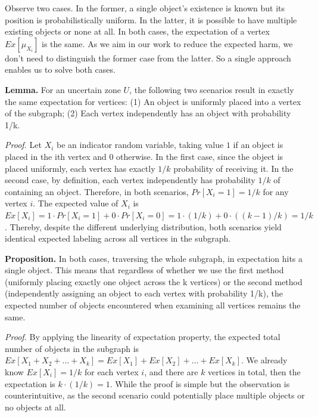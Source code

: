 \vspace{5mm}

Observe two cases. In the former, a single object's existence is known but its position is probabilistically uniform. In the latter, it is possible to have multiple existing objects or none at all. In both cases, the expectation of a vertex $Ex[\mu_{X_i}]$ is the same. As we aim in our work to reduce the expected harm, we don't need to distinguish the former case from the latter. So a single approach enables us to solve both cases.

\textbf{Lemma.} For an uncertain zone $U$, the following two scenarios result in exactly the same expectation for vertices: (1) An object is uniformly placed into a vertex of the subgraph; (2) Each vertex independently has an object with probability 1/k.

\textit{Proof.} Let $X_i$ be an indicator random variable, taking value $1$ if an object is placed in the ith vertex and $0$ otherwise. In the first case, since the object is placed uniformly, each vertex has exactly $1/k$ probability of receiving it. In the second case, by definition, each vertex independently has probability $1/k$ of containing an object. Therefore, in both scenarios, $Pr[X_i=1] = 1/k$ for any vertex $i$. The expected value of $X_i$ is $Ex[X_i] = 1 · Pr[X_i=1] + 0 · Pr[X_i=0] = 1 · (1/k) + 0 · ((k-1)/k) = 1/k$. Thereby, despite the different underlying distribution, both scenarios yield identical expected labeling across all vertices in the subgraph.

\textbf{Proposition.} In both cases, traversing the whole subgraph, in expectation hits a single object. This means that regardless of whether we use the first method (uniformly placing exactly one object across the k vertices) or the second method (independently assigning an object to each vertex with probability 1/k), the expected number of objects encountered when examining all vertices remains the same.

\textit{Proof.} By applying the linearity of expectation property, the expected total number of objects in the subgraph is $Ex[X_1 + X_2 + \dots + X_k] = Ex[X_1] + Ex[X_2] + \dots + Ex[X_k]$. We already know $Ex[X_i] = 1/k$ for each vertex $i$, and there are $k$ vertices in total, then the expectation is $k · (1/k) = 1$. While the proof is simple but the observation is counterintuitive, as the second scenario could potentially place multiple objects or no objects at all.
